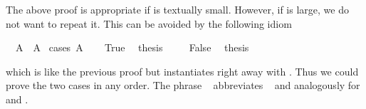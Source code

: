 \begin{isabellebody}
\begin{isamarkuptext}
The above proof is appropriate if  is textually small.
However, if  is large, we do not want to repeat it. This can
be avoided by the following idiom%
\end{isamarkuptext}%
\isamarkuptrue%
\isamarkupfalse%
\ {}{}\ A\ {}\ A{}\isanewline
%
\isadelimproof
%
\endisadelimproof
%
\isatagproof
{}\isamarkupfalse%
\ {}cases\ {}A{}{}\isanewline
\ \ \isamarkupfalse%
\ True\ \isamarkupfalse%
\ {}thesis\ \isamarkupfalse%
\isanewline
{}\isamarkupfalse%
\isanewline
\ \ \isamarkupfalse%
\ False\ \isamarkupfalse%
\ {}thesis\ \isamarkupfalse%
\isanewline
{}\isamarkupfalse%
%
\endisatagproof
{\isafoldproof}%
%
\isadelimproof
%
\endisadelimproof
%
\begin{isamarkuptext}%
\noindent which is like the previous proof but instantiates
 right away with . Thus we could prove the two
cases in any order. The phrase ~
abbreviates ~ and analogously for
 and .


\end{isamarkuptext}
\end{isabellebody}
